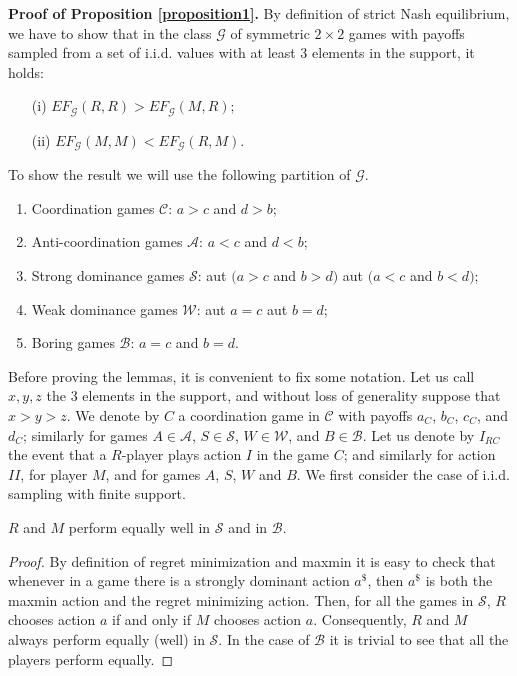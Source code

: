 \documentclass[fleqn,reqno,11pt]{article}
\begin{document}
\vspace{.5cm}


\noindent \textbf{Proof of Proposition \ref{proposition1}.} By definition of strict Nash equilibrium, we have to
show that in the class $\mathcal{G}$ of symmetric $2\times2$ games with payoffs sampled from a set of i.i.d. values with at least 3 elements in the support, it holds:
\begin{itemize}
\item[(i)] $EF_{\mathcal{G}}(R,R)>EF_{\mathcal{G}}(M,R);$
\item[(ii)] $EF_{\mathcal{G}}(M,M)<EF_{\mathcal{G}}(R,M).$
\end{itemize}


\noindent To show
the result we will use the following partition of $\mathcal{G}$.
\begin{enumerate}
\item Coordination games $\mathcal{C}$: $a>c$ and $d>b$;
\item Anti-coordination games $\mathcal{A}$: $a<c$ and $d<b$;
\item Strong dominance games $\mathcal{S}$: aut $(a>c$ and $b>d)$
aut $(a<c$ and $b<d)$;
\item Weak dominance games $\mathcal{W}$: aut $a=c$ aut $b=d$;
\item Boring games $\mathcal{B}$: $a=c$ and $b=d$.
\end{enumerate}
Before proving the lemmas, it is convenient to fix some notation. Let us call $x,y,z$ the 3 elements in the support, and without loss of generality suppose that $ x > y > z $. 
We denote by $C$ a coordination game in $\mathcal{C}$ with
payoffs $a_{C}$, $b_{C}$, $c_{C}$, and $d_{C}$;
similarly for games $A \in \mathcal{A}$, $S \in \mathcal{S}$, $W \in \mathcal{W}$, and $B \in \mathcal{B}$. 
Let us denote by $I_{RC}$ the event that a $R$-player plays action $I$ in the game $C$; and similarly for action $II$, for player $M$, and for games $A$, $S$, $W$ and $B$. We first consider the case of i.i.d. sampling with finite support.


\medskip{}


\begin{lemma} \label{lemma:S-B games}
$R$ and $M$ perform equally well in $\mathcal{S}$
and in $\mathcal{B}$. 
\end{lemma}

\begin{proof}
By definition of regret minimization and maxmin it
is easy to check that whenever in a game there is a strongly dominant
action $a^{\$}$, then $a^{\$}$ is both the maxmin action and the
regret minimizing action. Then, for all the games in $\mathcal{S}$,
$R$ chooses action $a$ if and only if $M$ chooses action $a$. Consequently,
$R$ and $M$ always perform equally (well) in $\mathcal{S}$. In
the case of $\mathcal{B}$ it is trivial to see that all the players
perform equally.
\end{proof}
\end{document}
